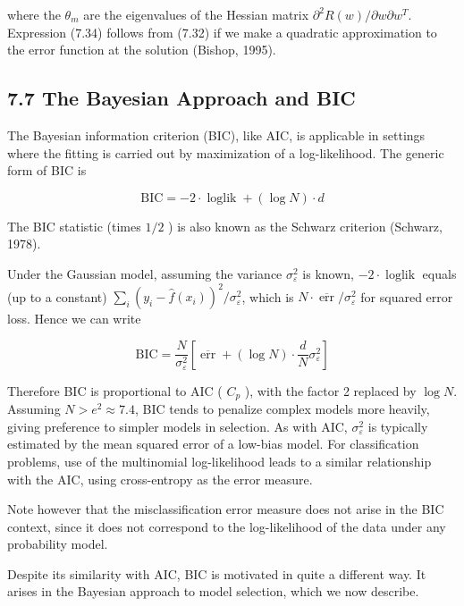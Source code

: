 \documentclass[10pt]{article}
\begin{document}
where the $\theta_{m}$ are the eigenvalues of the Hessian matrix $\partial^{2} R(w) / \partial w \partial w^{T}$. Expression (7.34) follows from (7.32) if we make a quadratic approximation to the error function at the solution (Bishop, 1995).

\subsection*{7.7 The Bayesian Approach and BIC}
The Bayesian information criterion (BIC), like AIC, is applicable in settings where the fitting is carried out by maximization of a log-likelihood. The generic form of BIC is


\begin{equation*}
\mathrm{BIC}=-2 \cdot \operatorname{loglik}+(\log N) \cdot d \tag{7.35}
\end{equation*}


The BIC statistic (times $1 / 2$ ) is also known as the Schwarz criterion (Schwarz, 1978).

Under the Gaussian model, assuming the variance $\sigma_{\varepsilon}^{2}$ is known, $-2 \cdot \operatorname{loglik}$ equals (up to a constant) $\sum_{i}\left(y_{i}-\hat{f}\left(x_{i}\right)\right)^{2} / \sigma_{\varepsilon}^{2}$, which is $N \cdot \overline{\operatorname{err}} / \sigma_{\varepsilon}^{2}$ for squared error loss. Hence we can write


\begin{equation*}
\mathrm{BIC}=\frac{N}{\sigma_{\varepsilon}^{2}}\left[\overline{\operatorname{err}}+(\log N) \cdot \frac{d}{N} \sigma_{\varepsilon}^{2}\right] \tag{7.36}
\end{equation*}


Therefore BIC is proportional to AIC ( $C_{p}$ ), with the factor 2 replaced by $\log N$. Assuming $N>e^{2} \approx 7.4$, BIC tends to penalize complex models more heavily, giving preference to simpler models in selection. As with AIC, $\sigma_{\varepsilon}^{2}$ is typically estimated by the mean squared error of a low-bias model. For classification problems, use of the multinomial log-likelihood leads to a similar relationship with the AIC, using cross-entropy as the error measure.

Note however that the misclassification error measure does not arise in the BIC context, since it does not correspond to the log-likelihood of the data under any probability model.

Despite its similarity with AIC, BIC is motivated in quite a different way. It arises in the Bayesian approach to model selection, which we now describe.
\end{document}
